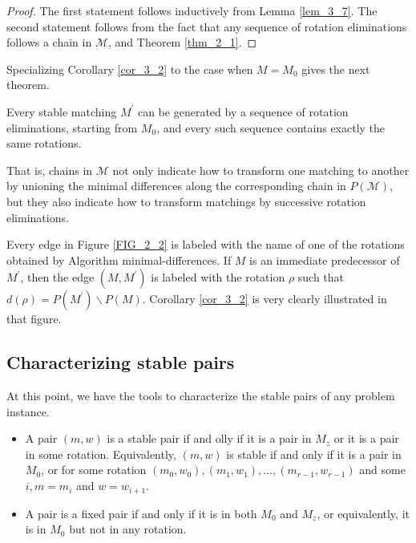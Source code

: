 \begin{proof}
    The first statement follows inductively from Lemma \ref{lem_3_7}. The second statement follows from the fact that any sequence of rotation eliminations follows a chain in $\mathcal{M}$, and Theorem \ref{thm_2_1}.
\end{proof}

Specializing Corollary \ref{cor_3_2} to the case when $M=M_0$ gives the next theorem.

\begin{theorem}\label{thm_3_5}
    Every stable matching $M^{\prime}$ can be generated by a sequence of rotation eliminations, starting from $M_0$, and every such sequence contains exactly the same rotations.
\end{theorem}

That is, chains in $\mathcal{M}$ not only indicate how to transform one matching to another by unioning the minimal differences along the corresponding chain in $P(\mathcal{M})$, but they also indicate how to transform matchings by successive rotation eliminations.

\begin{exmp}\label{exmp_3_12}
    Every edge in Figure \ref{FIG_2_2} is labeled with the name of one of the rotations obtained by Algorithm minimal-differences. If $M$ is an immediate predecessor of $M^{\prime}$, then the edge $\left(M, M^{\prime}\right)$ is labeled with the rotation $\rho$ such that $d(\rho)=P\left(M^{\prime}\right) \backslash P(M)$. Corollary \ref{cor_3_2} is very clearly illustrated in that figure.
\end{exmp}

\subsection{Characterizing stable pairs}

At this point, we have the tools to characterize the stable pairs of any problem instance.

\begin{theorem}\label{thm_3_6}
    \begin{itemize}
        \item A pair $(m, w)$ is a stable pair if and olly if it is a pair in $M_z$ or it is a pair in some rotation. Equivalently, $(m, w)$ is stable if and only if it is a pair in $M_0$, or for some rotation $\left(m_0, w_0\right),\left(m_1, w_1\right), \ldots,\left(m_{r-1}, w_{r-1}\right)$ and some $i, m=m_i$ and $w=w_{i+1}$.
        \item  A pair is a fixed pair if and only if it is in both $M_0$ and $M_z$, or equivalently, it is in $M_0$ but not in any rotation.
    \end{itemize}
\end{theorem}

